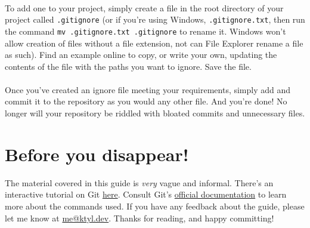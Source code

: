 \documentclass{article}
\begin{document}
\paragraph{}
To add one to your project, simply create a file in the root directory of your project called \texttt{.gitignore} (or if you're using Windows, \texttt{.gitignore.txt}, then run the command \texttt{mv .gitignore.txt .gitignore} to rename it. Windows won't allow creation of files without a file extension, not can File Explorer rename a file as such). Find an example online to copy, or write your own, updating the contents of the file with the paths you want to ignore. Save the file.

\paragraph{}
Once you've created an ignore file meeting your requirements, simply add and commit it to the repository as you would any other file. And you're done! No longer will your repository be riddled with bloated commits and unnecessary files.

\section{Before you disappear!}
The material covered in this guide is \textit{very} vague and informal. There's an interactive tutorial on Git \href{https://try.github.io/}{here}. Consult Git's \href{https://git-scm.com/documentation}{official documentation} to learn more about the commands used. If you have any feedback about the guide, please let me know at \href{mailto:me@ktyl.dev}{me@ktyl.dev}. Thanks for reading, and happy committing!
\end{document}
